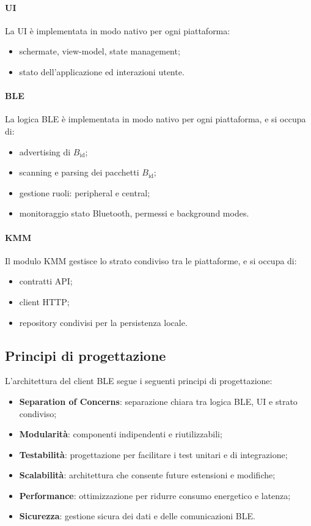 \documentclass[a4paper,11pt,table,dvipsnames]{article}
\begin{document}
\paragraph{UI}
La UI è implementata in modo nativo per ogni piattaforma:
\begin{itemize}
    \item schermate, view-model, state management;
    \item stato dell'applicazione ed interazioni utente.
\end{itemize}

\paragraph{BLE}
La logica BLE è implementata in modo nativo per ogni piattaforma, e si occupa di:
\begin{itemize}
    \item advertising di \(B_{\text{id}}\);
    \item scanning e parsing dei pacchetti \(B_{\text{id}}\);
    \item gestione ruoli: peripheral e central;
    \item monitoraggio stato Bluetooth, permessi e background modes.
\end{itemize}

\paragraph{KMM}
Il modulo KMM gestisce lo strato condiviso tra le piattaforme, e si occupa di:
\begin{itemize}
    \item contratti API;
    \item client HTTP;
    \item repository condivisi per la persistenza locale.
\end{itemize}

\subsection{Principi di progettazione}
L'architettura del client BLE segue i seguenti principi di progettazione:
\begin{itemize}
    \item \textbf{Separation of Concerns}: separazione chiara tra logica BLE, UI e strato condiviso;
    \item \textbf{Modularità}: componenti indipendenti e riutilizzabili;
    \item \textbf{Testabilità}: progettazione per facilitare i test unitari e di integrazione;
    \item \textbf{Scalabilità}: architettura che consente future estensioni e modifiche;
    \item \textbf{Performance}: ottimizzazione per ridurre consumo energetico e latenza;
    \item \textbf{Sicurezza}: gestione sicura dei dati e delle comunicazioni BLE.
\end{itemize}
\end{document}

